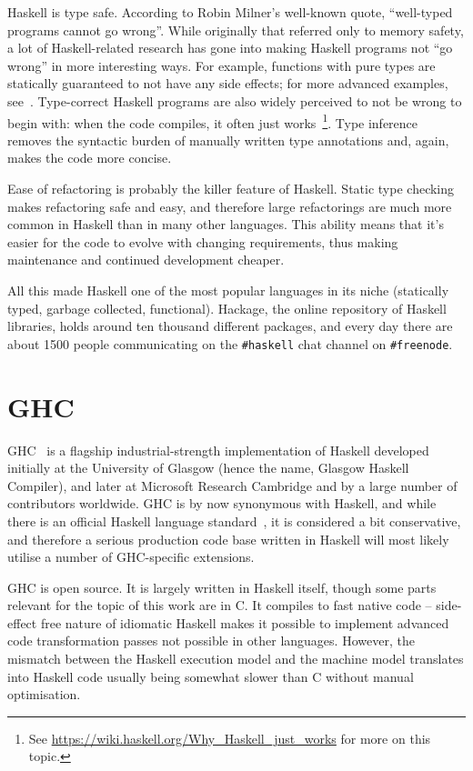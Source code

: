 \documentclass[a4paper,11pt,oneside]{report}
\begin{document}
Haskell is type safe. According to Robin Milner's well-known quote, ``well-typed
programs cannot go wrong''. While originally that referred only to memory
safety, a lot of Haskell-related research has gone into making Haskell programs
not ``go wrong'' in more interesting ways. For example, functions with pure
types are statically guaranteed to not have any side effects; for more advanced
examples, see~\cite{bib:gibbons2003}. Type-correct Haskell programs are also
widely perceived to not be wrong to begin with: when the code compiles, it often
just works~\footnote{See \url{https://wiki.haskell.org/Why_Haskell_just_works}
  for more on this topic.}. Type inference removes the syntactic burden of
manually written type annotations and, again, makes the code more concise.

Ease of refactoring is probably the killer feature of Haskell. Static type
checking makes refactoring safe and easy, and therefore large refactorings are
much more common in Haskell than in many other languages. This ability means
that it's easier for the code to evolve with changing requirements, thus making
maintenance and continued development cheaper.

All this made Haskell one of the most popular languages in its niche (statically
typed, garbage collected, functional). Hackage, the online repository of Haskell
libraries, holds around ten thousand different packages, and every day there are
about 1500 people communicating on the \texttt{\#haskell} chat channel on
\texttt{\#freenode}.

\section{GHC}

GHC~\cite{bib:ghc} is a flagship industrial-strength implementation of Haskell
developed initially at the University of Glasgow (hence the name, Glasgow
Haskell Compiler), and later at Microsoft Research Cambridge and by a large
number of contributors worldwide. GHC is by now synonymous with Haskell, and
while there is an official Haskell language standard~\cite{bib:haskell2010}, it
is considered a bit conservative, and therefore a serious production code base
written in Haskell will most likely utilise a number of GHC-specific extensions.

GHC is open source. It is largely written in Haskell itself, though some parts
relevant for the topic of this work are in C. It compiles to fast native code --
side-effect free nature of idiomatic Haskell makes it possible to implement
advanced code transformation passes not possible in other languages. However,
the mismatch between the Haskell execution model and the machine model
translates into Haskell code usually being somewhat slower than C without manual
optimisation.
\end{document}
